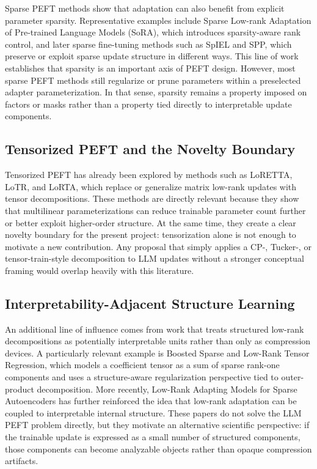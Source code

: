 \documentclass[11pt]{article}
\begin{document}
Sparse PEFT methods show that adaptation can also benefit from explicit parameter sparsity. Representative examples include Sparse Low-rank Adaptation of Pre-trained Language Models (SoRA), which introduces sparsity-aware rank control, and later sparse fine-tuning methods such as SpIEL and SPP, which preserve or exploit sparse update structure in different ways. This line of work establishes that sparsity is an important axis of PEFT design. However, most sparse PEFT methods still regularize or prune parameters within a preselected adapter parameterization. In that sense, sparsity remains a property imposed on factors or masks rather than a property tied directly to interpretable update components.

\subsection{Tensorized PEFT and the Novelty Boundary}

Tensorized PEFT has already been explored by methods such as LoRETTA, LoTR, and LoRTA, which replace or generalize matrix low-rank updates with tensor decompositions. These methods are directly relevant because they show that multilinear parameterizations can reduce trainable parameter count further or better exploit higher-order structure. At the same time, they create a clear novelty boundary for the present project: tensorization alone is not enough to motivate a new contribution. Any proposal that simply applies a CP-, Tucker-, or tensor-train-style decomposition to LLM updates without a stronger conceptual framing would overlap heavily with this literature.

\subsection{Interpretability-Adjacent Structure Learning}

An additional line of influence comes from work that treats structured low-rank decompositions as potentially interpretable units rather than only as compression devices. A particularly relevant example is Boosted Sparse and Low-Rank Tensor Regression, which models a coefficient tensor as a sum of sparse rank-one components and uses a structure-aware regularization perspective tied to outer-product decomposition. More recently, Low-Rank Adapting Models for Sparse Autoencoders has further reinforced the idea that low-rank adaptation can be coupled to interpretable internal structure. These papers do not solve the LLM PEFT problem directly, but they motivate an alternative scientific perspective: if the trainable update is expressed as a small number of structured components, those components can become analyzable objects rather than opaque compression artifacts.
\end{document}
